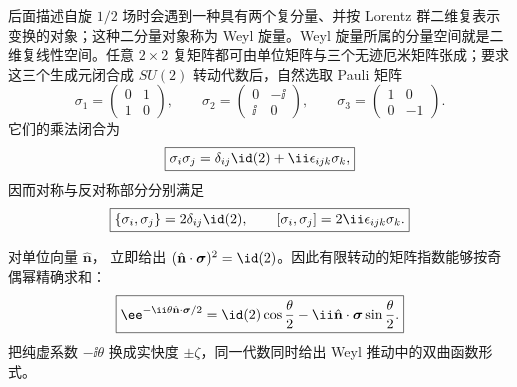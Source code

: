 后面描述自旋 $1/2$ 场时会遇到一种具有两个复分量、并按 Lorentz 群二维复表示变换的对象；这种二分量对象称为 Weyl 旋量。Weyl 旋量所属的分量空间就是二维复线性空间。任意 $2\times2$ 复矩阵都可由单位矩阵与三个无迹厄米矩阵张成；要求这三个生成元闭合成 $SU(2)$ 转动代数后，自然选取 Pauli 矩阵
\begin{equation}
 \sigma_1=\begin{pmatrix}0&1\\1&0\end{pmatrix},\qquad
 \sigma_2=\begin{pmatrix}0&-\ii\\ \ii&0\end{pmatrix},\qquad
 \sigma_3=\begin{pmatrix}1&0\\0&-1\end{pmatrix}.
 \label{eq:pauli-explicit-r10}
\end{equation}
它们的乘法闭合为
\begin{equation}
 \boxed{
 \sigma_i\sigma_j
 =\delta_{ij}\id(2)+\ii\epsilon_{ijk}\sigma_k,}
 \label{eq:pauli-product-proof-r10}
\end{equation}
因而对称与反对称部分分别满足
\begin{equation}
 \boxed{
 \{\sigma_i,\sigma_j\}=2\delta_{ij}\id(2),
 \qquad
 [\sigma_i,\sigma_j]=2\ii\epsilon_{ijk}\sigma_k.}
 \label{eq:pauli-comm-anticomm-r10}
\end{equation}

对单位向量 $\hat{\mathbf n}$， 立即给出
$(\hat{\mathbf n}\cdot\boldsymbol\sigma)^2=\id(2)$。因此有限转动的矩阵指数能够按奇偶幂精确求和：
\begin{equation}
 \boxed{
 \ee^{-\ii\theta\hat{\mathbf n}\cdot\boldsymbol\sigma/2}
 =\id(2)\cos\frac{\theta}{2}
 -\ii\hat{\mathbf n}\cdot\boldsymbol\sigma\sin\frac{\theta}{2}.}
 \label{eq:pauli-exponential-r68}
\end{equation}
把纯虚系数 $-\ii\theta$ 换成实快度 $\pm\zeta$，同一代数同时给出 Weyl 推动中的双曲函数形式。

